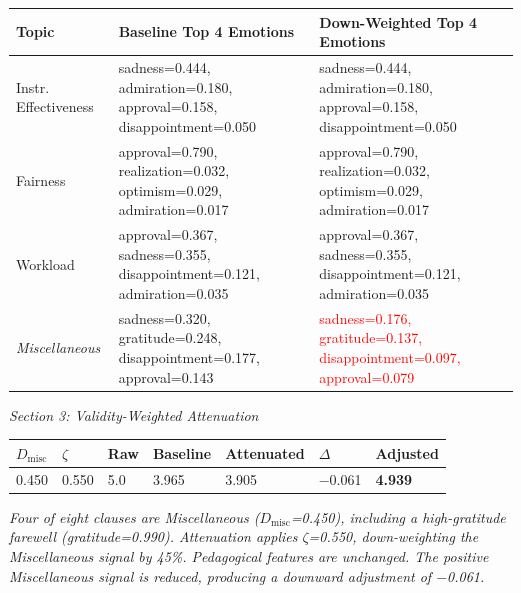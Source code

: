 \documentclass{article}
\begin{document}
\vspace{0.3em}
\noindent
\begin{tabular}{p{3.5cm} p{7cm} p{7cm}}
\toprule
\textbf{Topic} & \textbf{Baseline Top 4 Emotions} & \textbf{Down-Weighted Top 4 Emotions} \\
\midrule
Instr. Effectiveness & sadness=0.444, admiration=0.180, approval=0.158, disappointment=0.050 & sadness=0.444, admiration=0.180, approval=0.158, disappointment=0.050 \\
\addlinespace
Fairness & approval=0.790, realization=0.032, optimism=0.029, admiration=0.017 & approval=0.790, realization=0.032, optimism=0.029, admiration=0.017 \\
\addlinespace
Workload & approval=0.367, sadness=0.355, disappointment=0.121, admiration=0.035 & approval=0.367, sadness=0.355, disappointment=0.121, admiration=0.035 \\
\addlinespace
\textit{Miscellaneous} & sadness=0.320, gratitude=0.248, disappointment=0.177, approval=0.143 & \textcolor{red}{sadness=0.176, gratitude=0.137, disappointment=0.097, approval=0.079} \\
\bottomrule
\end{tabular}

\vspace{0.8em}
\noindent\textit{Section 3: Validity-Weighted Attenuation}

\vspace{0.3em}
\noindent
\begin{tabular}{p{2cm} p{2cm} p{2cm} p{2.5cm} p{2.5cm} p{2cm} p{2.5cm}}
\toprule
$D_{\text{misc}}$ & $\zeta$ & \textbf{Raw} & \textbf{Baseline} & \textbf{Attenuated} & $\Delta$ & \textbf{Adjusted} \\
\midrule
0.450 & 0.550 & 5.0 & 3.965 & 3.905 & $-$0.061 & \textbf{4.939} \\
\bottomrule
\end{tabular}

\vspace{0.5em}
\small\textit{Four of eight clauses are Miscellaneous ($D_{\text{misc}}$=0.450), including a high-gratitude farewell (gratitude=0.990). Attenuation applies $\zeta$=0.550, down-weighting the Miscellaneous signal by 45\%. Pedagogical features are unchanged. The positive Miscellaneous signal is reduced, producing a downward adjustment of $-$0.061.}
\end{document}
